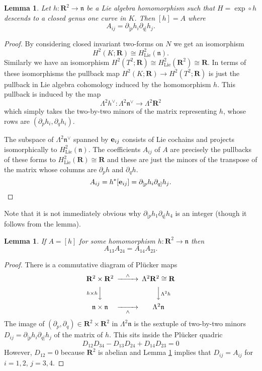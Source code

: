 \documentclass[11pt]{amsart}
\newcommand{\RR}{\mathbf{R}}
\newcommand{\nn}{\mathfrak{n}}
\newcommand{\OP}{\operatorname}
\numberwithin{equation}{section}
\newtheorem{lma}[equation]{Lemma}
\theoremstyle{definition}
\theoremstyle{remark}
\begin{document}
\begin{lma}\label{homclass}
Let $h\colon\RR^2\to\nn$ be a Lie algebra homomorphism such that $H=\exp\circ h$ descends to a closed genus one curve in $K$. Then $[h]=A$ where
\[A_{ij}=\partial_{[p}h_i\partial_{q]}h_j.\]
\end{lma}
\begin{proof}
By considering closed invariant two-forms on $N$ we get an isomorphism \cite[Corollary 4.7]{LGLA}
\[H^2(K;\RR)\cong H_{\OP{Lie}}^2(\nn).\]
Similarly we have an isomorphism $H^2(T^2;\RR)\cong H_{\OP{Lie}}^2(\RR^2)\cong\RR$. In terms of these isomorphisms the pullback map $H^2(K;\RR)\to H^2(T^2;\RR)$ is just the pullback in Lie algebra cohomology induced by the homomorphism $h$. This pullback is induced by the map
\[\Lambda^2h^{\vee}\colon\Lambda^2\nn^{\vee}\to\Lambda^2\RR^2\]
which simply takes the two-by-two minors of the matrix representing $h$, whose rows are $(\partial_ph_i,\partial_qh_i)$.

The subspace of $\Lambda^2\nn^{\vee}$ spanned by ${\bf e}_{ij}$ consists of Lie cochains and projects isomorphically to $H_{\OP{Lie}}^2(\nn)$. The coefficients $A_{ij}$ of $A$ are precisely the pullbacks of these forms to $H_{\OP{Lie}}^2(\RR)\cong\RR$ and these are just the minors of the transpose of the matrix whose columns are $\partial_ph$ and $\partial_qh$.
\[A_{ij}=h^*[{\bf e}_{ij}]=\partial_{[p}h_i\partial_{q]}h_j.\]
\end{proof}
Note that it is not immediately obvious why $\partial_{[p}h_1\partial_{q]}h_4$ is an integer (though it follows from the lemma).
\begin{lma}\label{pluck}
If $A=[h]$ for some homomorphism $h\colon\RR^2\to\nn$ then
\[A_{13}A_{24}=A_{14}A_{23}.\]
\end{lma}
\begin{proof}
There is a commutative diagram of Pl\"{u}cker maps
\[\begin{CD}
\RR^2\times\RR^2 @>{\wedge}>> \Lambda^2\RR^2\cong\RR\\
@V{h\times h}VV @VV{\Lambda^2h}V\\
\nn\times\nn @>>{\wedge}> \Lambda^2\nn
\end{CD}\]
The image of $(\partial_p,\partial_q)\in\RR^2\times\RR^2$ in $\Lambda^2\nn$ is the sextuple of two-by-two minors $D_{ij}=\partial_{[p}h_i\partial_{q]}h_j$ of the matrix of $h$. This sits inside the Pl\"{u}cker quadric
\[D_{12}D_{34}-D_{13}D_{24}+D_{14}D_{23}=0\]
However, $D_{12}=0$ because $\RR^2$ is abelian and Lemma \ref{homclass} implies that $D_{ij}=A_{ij}$ for $i=1,2$, $j=3,4$.
\end{proof}
\end{document}

